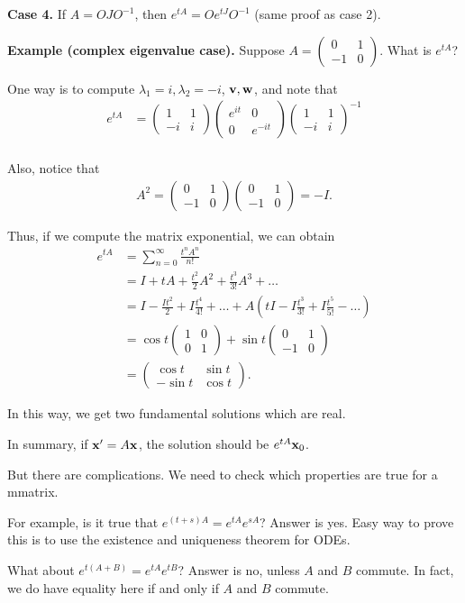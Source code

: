 \documentclass{article}
\newcommand{\mat}[1]{\begin{pmatrix}#1\end{pmatrix}}
\begin{document}
{\bf Case 4.} If $A = O J O^{-1}$, then $e^{tA} = O e^{tJ} O^{-1}$ (same proof as case 2).

{\bf Example (complex eigenvalue case).} Suppose $A = \mat{0 & 1 \\ -1 & 0}$.  What is $e^{tA}$?

One way is to compute $\lambda_1 = i, \lambda_2 = -i$, $\mathbf{v}, \mathbf{w}$, and note that
\begin{align*}
  e^{tA} &= \mat{1 & 1 \\ -i & i} \mat{e^{it} & 0 \\ 0 & e^{-it}} \mat{1 & 1 \\ -i & i}^{-1} \\
\end{align*}

Also, notice that
\begin{align*}
  A^2 = \mat{0 & 1 \\ -1 & 0} \mat{0 & 1 \\ -1 & 0} = -I.
\end{align*}

Thus, if we compute the matrix exponential, we can obtain
\begin{align*}
  e^{tA} &= \sum_{n=0}^{\infty} \frac{t^n A^n}{n!} \\
  &= I + tA + \frac{t^2}{2} A^2 + \frac{t^3}{3!} A^3 + \dots \\
  &= I - \frac{I t^2}{2} + I \frac{t^4}{4!} + \dots + A\left(  t I - I \frac{t^3}{3!} + I \frac{t^5}{5!} - \dots \right) \\
  &= \cos t \mat{1 & 0 \\ 0 & 1} + \sin t \mat{0 & 1 \\ -1 & 0} \\
  &= \mat{\cos t & \sin t \\ -\sin t & \cos t}.
\end{align*}

In this way, we get two fundamental solutions which are real.

In summary, if $\mathbf{x}' = A \mathbf{x}$, the solution should be $e^{tA} \mathbf{x}_0$.

But there are complications.  We need to check which properties are true for a mmatrix.

For example, is it true that $e^{(t+s)A} = e^{tA} e^{sA}$?  Answer is yes.  Easy way to prove this is to use the existence and uniqueness theorem for ODEs.

What about $e^{t(A+B)} = e^{tA} e^{tB}$?  Answer is no, unless $A$ and $B$ commute.  In fact, we do have equality here if and only if $A$ and $B$ commute. 
\end{document}
